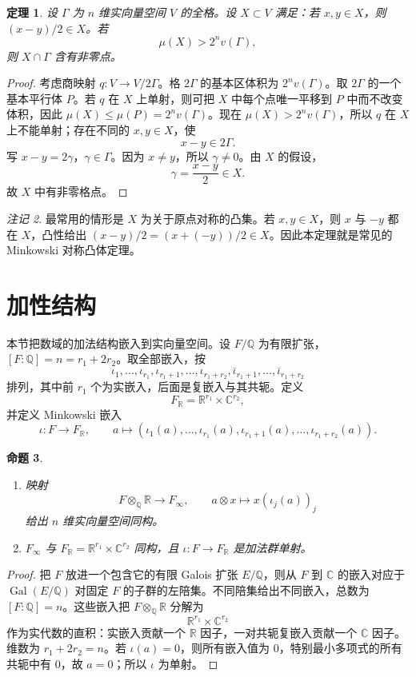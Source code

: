 \documentclass[11pt,a4paper,openany]{ctexbook}
\numberwithin{equation}{chapter}
\newcommand{\Q}{\mathbb{Q}}
\newcommand{\R}{\mathbb{R}}
\newcommand{\C}{\mathbb{C}}
\newcommand{\Gal}{\operatorname{Gal}}
\theoremstyle{plain}
\newtheorem{theorem}{定理}[chapter]
\newtheorem{proposition}[theorem]{命题}
\theoremstyle{definition}
\theoremstyle{remark}
\newtheorem{remark}[theorem]{注记}
\begin{document}
\begin{theorem}
设 $\Gamma$ 为 $n$ 维实向量空间 $V$ 的全格。设 $X\subset V$ 满足：若 $x,y\in X$，则 $(x-y)/2\in X$。若
\[
\mu(X)>2^n v(\Gamma),
\]
则 $X\cap\Gamma$ 含有非零点。
\end{theorem}

\begin{proof}
考虑商映射 $q:V\to V/2\Gamma$。格 $2\Gamma$ 的基本区体积为
$2^n v(\Gamma)$。取 $2\Gamma$ 的一个基本平行体 $P$。若 $q$ 在 $X$ 上单射，则可把
$X$ 中每个点唯一平移到 $P$ 中而不改变体积，因此 $\mu(X)\le\mu(P)=2^n v(\Gamma)$。现在
$\mu(X)>2^n v(\Gamma)$，所以 $q$ 在 $X$ 上不能单射；存在不同的 $x,y\in X$，使
\[
x-y\in2\Gamma.
\]
写 $x-y=2\gamma$，$\gamma\in\Gamma$。因为 $x\ne y$，所以 $\gamma\ne0$。由 $X$ 的假设，
\[
\gamma=\frac{x-y}{2}\in X.
\]
故 $X$ 中有非零格点。
\end{proof}

\begin{remark}
最常用的情形是 $X$ 为关于原点对称的凸集。若 $x,y\in X$，则 $x$ 与 $-y$ 都在 $X$，凸性给出 $(x-y)/2=(x+(-y))/2\in X$。因此本定理就是常见的 Minkowski 对称凸体定理。
\end{remark}

\section{加性结构}

本节把数域的加法结构嵌入到实向量空间。设 $F/\Q$ 为有限扩张，$[F:\Q]=n=r_1+2r_2$。取全部嵌入，按
\[
\iota_1,\dots,\iota_{r_1},
\iota_{r_1+1},\dots,\iota_{r_1+r_2},
\overline{\iota}_{r_1+1},\dots,\overline{\iota}_{r_1+r_2}
\]
排列，其中前 $r_1$ 个为实嵌入，后面是复嵌入与其共轭。定义
\[
F_\R=\R^{r_1}\times\C^{r_2},
\]
并定义 Minkowski 嵌入
\[
\iota:F\longrightarrow F_\R,\qquad
a\longmapsto
(\iota_1(a),\dots,\iota_{r_1}(a),
\iota_{r_1+1}(a),\dots,\iota_{r_1+r_2}(a)).
\]

\begin{proposition}
\begin{enumerate}[label=(\arabic*)]
\item 映射
\[
F\otimes_\Q\R\longrightarrow F_\infty,\qquad
a\otimes x\longmapsto x(\iota_j(a))_j
\]
给出 $n$ 维实向量空间同构。
\item $F_\infty$ 与 $F_\R=\R^{r_1}\times\C^{r_2}$ 同构，且 $\iota:F\to F_\R$ 是加法群单射。
\end{enumerate}
\end{proposition}

\begin{proof}
把 $F$ 放进一个包含它的有限 Galois 扩张 $E/\Q$，则从 $F$ 到 $\C$ 的嵌入对应于
$\Gal(E/\Q)$ 对固定 $F$ 的子群的左陪集。不同陪集给出不同嵌入，总数为
$[F:\Q]=n$。这些嵌入把
$F\otimes_\Q\R$ 分解为
\[
\R^{r_1}\times\C^{r_2}
\]
作为实代数的直积：实嵌入贡献一个 $\R$ 因子，一对共轭复嵌入贡献一个
$\C$ 因子。维数为 $r_1+2r_2=n$。若 $\iota(a)=0$，则所有嵌入值为 $0$，特别最小多项式的所有共轭中有 $0$，故 $a=0$；所以 $\iota$ 为单射。
\end{proof}
\end{document}
